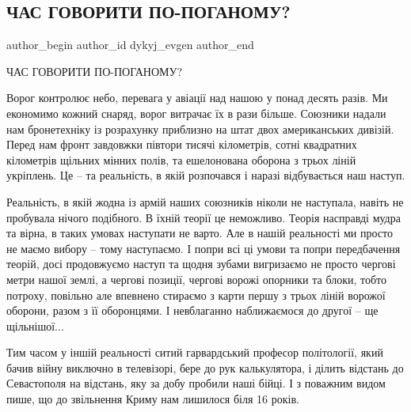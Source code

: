  
 
 
 
 

\subsection{ЧАС ГОВОРИТИ ПО-ПОГАНОМУ?}
\label{sec:01_07_2023.fb.dykyj_evgen.1.chas_govoryty_po_poganomu}

\ifcmt
 author_begin
   author_id dykyj_evgen
 author_end
\fi

ЧАС ГОВОРИТИ ПО-ПОГАНОМУ?

Ворог контролює небо, перевага у авіації над нашою у понад десять разів. Ми
економимо кожний снаряд, ворог витрачає їх в рази більше. Союзники надали нам
бронетехніку із розрахунку приблизно на штат двох американських дивізій. Перед
нам фронт завдовжки півтори тисячі кілометрів, сотні квадратних кілометрів
щільних мінних полів, та ешелонована оборона з трьох ліній укріплень. Це – та
реальність, в якій розпочався і наразі відбувається наш наступ.

Реальність, в якій жодна із армій наших союзників ніколи не наступала, навіть
не пробувала нічого подібного. В їхній теорії це неможливо. Теорія насправді
мудра та вірна, в таких умовах наступати не варто. Але в нашій реальності ми
просто не маємо вибору – тому наступаємо. І попри всі ці умови та попри
передбачення теорій, досі продовжуємо наступ та щодня зубами вигризаємо не
просто чергові метри нашої землі, а чергові позиції, чергові ворожі опорники та
блоки, тобто потроху, повільно але впевнено стираємо з карти першу з трьох
ліній ворожої оборони, разом з її оборонцями. І невблаганно наближаємося до
другої – ще щільнішої...

Тим часом у іншій реальності ситий гарвардський професор політології, який
бачив війну виключно в телевізорі, бере до рук калькулятора, і ділить відстань
до Севастополя на відстань, яку за добу пробили наші бійці. І з поважним видом
пише, що до звільнення Криму нам лишилося біля 16 років. 

